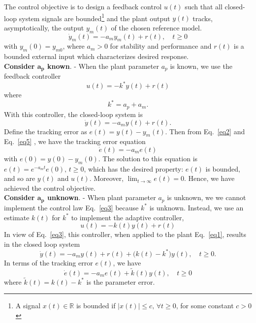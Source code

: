 \documentclass[12pt,a4paper,oneside]{book}
\begin{document}
\begin{onehalfspace}
\begin{example}
	The control objective is to design a feedback control $u(t)$ such that all closed-loop system signals are bounded\footnote{A signal $x(t)\in\mathbb{R}$ is bounded if $|x(t)|\le c,\,\forall t\ge0$, for some constant $c>0$} and the plant output $y(t)$ tracks, asymptotically, the output $y_m(t)$ of the chosen reference model.
	\begin{equation}\label{eq2}
		\dot{y}_m(t)=-a_my_m(t)+r(t), \quad t\ge0
	\end{equation}
	with $y_m(0)=y_{m0}$, where $a_m>0$ for stability and performance and $r(t)$ is a bounded external input which characterizes desired response. \\
	
	\textbf{Consider $\boldsymbol{a_p}$ known}. - When the plant parameter $a_p$ is known, we use the feedback controller 
	\begin{equation}\label{eq3}
		u(t)=-k^*y(t)+r(t)
	\end{equation}
	where 
	\begin{equation}\label{eq4}
		k^*= a_p+a_m.
	\end{equation}
	With this controller, the closed-loop system is 
	\begin{equation}\label{eq5}
		\dot{y}(t)=-a_my(t)+r(t).
	\end{equation}
	Define the tracking error as $e(t)=y(t)-y_m(t)$. Then from Eq.~\ref{eq2} and Eq.~\ref{eq5} , we have the tracking error equation 
	\begin{equation}\label{eq6}
		\dot{e}(t)=-a_me(t)
	\end{equation}
	with $e(0)=y(0)-y_m(0)$. The solution to this equation is $e(t)=e^{-a_mt}e(0),\,t\ge0$, which has the desired property: $e(t)$ is bounded, and so are $y(t)$ and $u(t)$. Moreover, $\lim_{t\rightarrow\infty}e(t)=0$. Hence, we have achieved the control objective. \\
	
	\textbf{Consider $\boldsymbol{a_p}$ unknown}. - When plant parameter $a_p$ is unknown, we we cannot implement the control law Eq.~\ref{eq3} because $k^*$ is unknown. Instead, we use an estimate $k(t)$ for $k^*$ to implement the adaptive controller,
	\begin{equation}\label{eq7}
		u(t)=-k(t)y(t)+r(t)
	\end{equation}
	In view of Eq.~\ref{eq3}, this controller, when applied to the plant Eq.~\ref{eq1}, results in the closed loop system 
	\begin{equation}\label{eq8}
		\dot{y}(t)=-a_my(t)+r(t)+\big(k(t)-k^*\big)y(t),\quad t\ge0.
	\end{equation}
	In terms of the tracking error $e(t)$, we have
	\begin{equation}\label{eq9}
		\dot{e}(t)=-a_me(t)+\tilde{k}(t)y(t),\quad t\ge0
	\end{equation} 
	where $\tilde{k}(t)=k(t)-k^*$ is the parameter error.
	

\end{example}
\end{onehalfspace}
\end{document}
